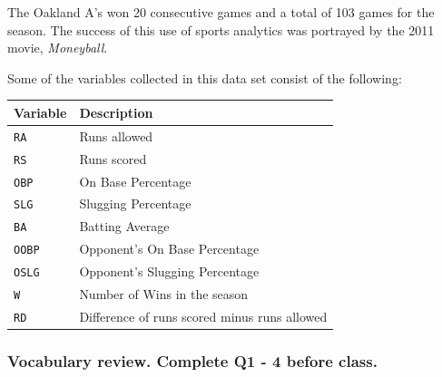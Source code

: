 \documentclass[
]{report}
\newenvironment{Shaded}{\begin{snugshade}}{\end{snugshade}}
\newcommand{\CommentTok}[1]{\textcolor[rgb]{0.56,0.35,0.01}{\textit{#1}}}
\newcommand{\DecValTok}[1]{\textcolor[rgb]{0.00,0.00,0.81}{#1}}
\newcommand{\KeywordTok}[1]{\textcolor[rgb]{0.13,0.29,0.53}{\textbf{#1}}}
\newcommand{\NormalTok}[1]{#1}
\newcommand{\OperatorTok}[1]{\textcolor[rgb]{0.81,0.36,0.00}{\textbf{#1}}}
\newcommand{\StringTok}[1]{\textcolor[rgb]{0.31,0.60,0.02}{#1}}
\begin{document}
The Oakland A's won 20 consecutive games and a total of 103 games for the season. The success of this use of sports analytics was portrayed by the 2011 movie, \emph{Moneyball}.

Some of the variables collected in this data set consist of the following:

\begin{longtable}[]{@{}ll@{}}
\toprule
\textbf{Variable} & \textbf{Description}\tabularnewline
\midrule
\endhead
\texttt{RA} & Runs allowed\tabularnewline
\texttt{RS} & Runs scored\tabularnewline
\texttt{OBP} & On Base Percentage\tabularnewline
\texttt{SLG} & Slugging Percentage\tabularnewline
\texttt{BA} & Batting Average\tabularnewline
\texttt{OOBP} & Opponent's On Base Percentage\tabularnewline
\texttt{OSLG} & Opponent's Slugging Percentage\tabularnewline
\texttt{W} & Number of Wins in the season\tabularnewline
\texttt{RD} & Difference of runs scored minus runs allowed\tabularnewline
\bottomrule
\end{longtable}

\begin{Shaded}
\end{Shaded}

\hypertarget{vocabulary-review.-complete-q1---4-before-class.-2}{%
\subsubsection*{Vocabulary review. Complete Q1 - 4 before class.}\label{vocabulary-review.-complete-q1---4-before-class.-2}}
\end{document}
